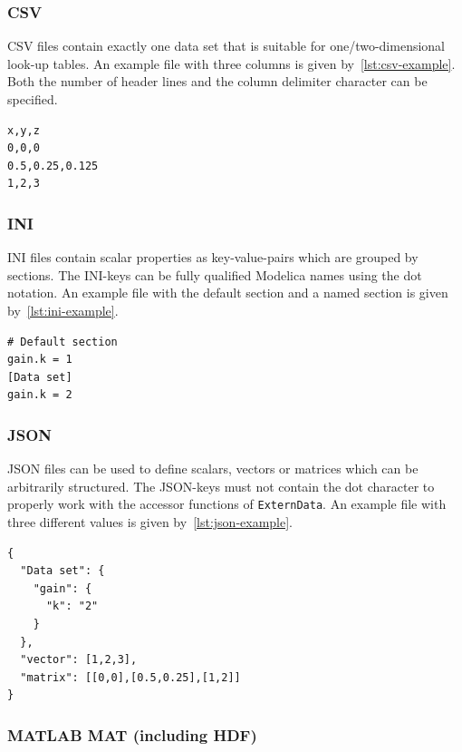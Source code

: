 \documentclass{modelica}
\newcommand{\modelica}[1]{\lstinline[language=modelica]|#1|}
\begin{document}
\subsubsection*{CSV}

CSV files contain exactly one data set that is suitable for one/two-dimensional look-up tables.
An example file with three columns is given by~\autoref{lst:csv-example}.
Both the number of header lines and the column delimiter character can be specified.

\begin{lstlisting}[caption=Example CSV file, label=lst:csv-example]
x,y,z
0,0,0
0.5,0.25,0.125
1,2,3
\end{lstlisting}

\subsubsection*{INI}

INI files contain scalar properties as key-value-pairs which are grouped by sections.
The INI-keys can be fully qualified Modelica names using the dot notation.
An example file with the default section and a named section is given by~\autoref{lst:ini-example}.

\begin{lstlisting}[caption=Example INI file, label=lst:ini-example]
# Default section
gain.k = 1
[Data set]
gain.k = 2
\end{lstlisting}

\subsubsection*{JSON}

JSON files can be used to define scalars, vectors or matrices which can be arbitrarily structured.
The JSON-keys must not contain the dot character to properly work with the accessor functions of \modelica{ExternData}.
An example file with three different values is given by~\autoref{lst:json-example}.

\begin{lstlisting}[caption=Example JSON file, label=lst:json-example]
{
  "Data set": {
    "gain": {
      "k": "2"
    }
  },
  "vector": [1,2,3],
  "matrix": [[0,0],[0.5,0.25],[1,2]]
}
\end{lstlisting}

\subsubsection*{MATLAB MAT (including HDF)}
\end{document}
